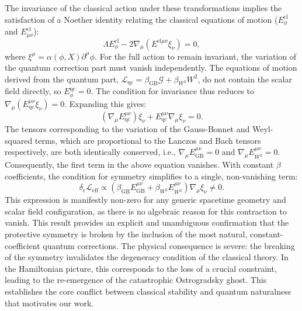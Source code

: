 \documentclass[twocolumn]{aastex631}
\begin{document}
The invariance of the classical action under these transformations implies the satisfaction of a Noether identity relating the classical equations of motion ($E_\phi^{\text{cl}}$ and $E_{\mu\nu}^{\text{cl}}$):
\begin{equation}
\Lambda E_\phi^{\text{cl}} - 2\nabla_\mu(E^{\text{cl} \mu\nu}\xi_\nu) = 0,
\end{equation}
where $\xi^\mu = \alpha(\phi, X) \partial^\mu\phi$. For the full action to remain invariant, the variation of the quantum correction part must vanish independently. The equations of motion derived from the quantum part, $\mathcal{L}_{\text{qc}} = \beta_{\text{GB}} \mathcal{G} + \beta_{W^2} W^2$, do not contain the scalar field directly, so $E_\phi^{\text{qc}} = 0$. The condition for invariance thus reduces to $\nabla_\mu(E_{\text{qc}}^{\mu\nu}\xi_\nu) = 0$. Expanding this gives:
\begin{equation}
(\nabla_\mu E_{\text{qc}}^{\mu\nu})\xi_\nu + E_{\text{qc}}^{\mu\nu} \nabla_\mu \xi_\nu = 0.
\end{equation}
The tensors corresponding to the variation of the Gauss-Bonnet and Weyl-squared terms, which are proportional to the Lanczos and Bach tensors respectively, are both identically conserved, i.e., $\nabla_\mu E_{\text{GB}}^{\mu\nu} = 0$ and $\nabla_\mu E_{W^2}^{\mu\nu} = 0$. Consequently, the first term in the above equation vanishes. With constant $\beta$ coefficients, the condition for symmetry simplifies to a single, non-vanishing term:
\begin{equation}
\label{eq:symm_breaking}
\delta_\epsilon \mathcal{L}_{\text{eff}} \propto \left( \beta_{\text{GB}} E_{\text{GB}}^{\mu\nu} + \beta_{W^2} E_{W^2}^{\mu\nu} \right) \nabla_\mu \xi_\nu \neq 0.
\end{equation}
This expression is manifestly non-zero for any generic spacetime geometry and scalar field configuration, as there is no algebraic reason for this contraction to vanish. This result provides an explicit and unambiguous confirmation that the protective symmetry is broken by the inclusion of the most natural, constant-coefficient quantum corrections. The physical consequence is severe: the breaking of the symmetry invalidates the degeneracy condition of the classical theory. In the Hamiltonian picture, this corresponds to the loss of a crucial constraint, leading to the re-emergence of the catastrophic Ostrogradsky ghost. This establishes the core conflict between classical stability and quantum naturalness that motivates our work.
\end{document}
